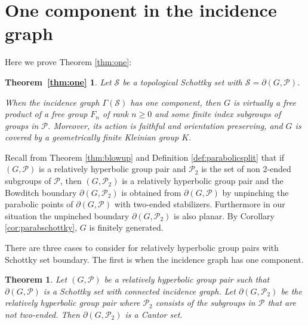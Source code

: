 \documentclass[11pt]{article}
\newtheorem{theorem}{Theorem}[section]
\newtheorem*{thmone}{Theorem~\ref{thm:one}}
\theoremstyle{definition}
\begin{document}
\section{One component in the incidence graph}
\label{sec:one} 

Here we prove Theorem \ref{thm:one}: 

\begin{thmone}
Let $\mathcal{S}$ be a topological Schottky set with $\mathcal{S} = \partial(G, \mathcal{P})$.
 
When the incidence graph $\Gamma(\mathcal{S})$ has one component, then $G$ is virtually a free product of a free group $F_n$ of rank $n\geq 0$ and some finite index subgroups of groups in $\mathcal{P}$. Moreover, its action is faithful and orientation preserving, and $G$ is covered by a geometrically finite Kleinian group $K$.
\end{thmone} 






Recall from Theorem \ref{thm:blowup}  and Definition \ref{def:parabolicsplit} that if $(G, \mathcal{P})$ is a relatively hyperbolic group pair and  $\mathcal{P}_2$ is the set of non 2-ended subgroups of $\mathcal{P}$, then $(G, \mathcal{P}_2)$ is a relatively hyperbolic group pair and the Bowditch boundary $\partial(G, \mathcal{P}_2)$ is obtained from $\partial(G, \mathcal{P})$ by unpinching the 
parabolic points of $\partial(G, \mathcal{P})$
with two-ended stabilizers. Furthermore in our situation the unpinched boundary $\partial(G, \mathcal{P}_2)$ is also planar. By Corollary \ref{cor:parabschottky}, $G$ is finitely generated. 


There are three cases to consider for relatively hyperbolic group pairs with Schottky set boundary.  The first is when the incidence graph has one component. 

\begin{theorem} \label{thm:cantorset} Let $(G, \mathcal{P})$ be a relatively hyperbolic group pair such that $ \partial(G, \mathcal{P})$ is a Schottky set with connected incidence graph.  Let  $\partial (G, \mathcal{P}_2)$ be the relatively hyperbolic group pair where  $\mathcal{P}_2$ consists of the subgroups in $\mathcal{P}$ that are not two-ended. 
Then  $\partial (G, \mathcal{P}_2)$
 is a Cantor set. \end{theorem} 
\end{document}
